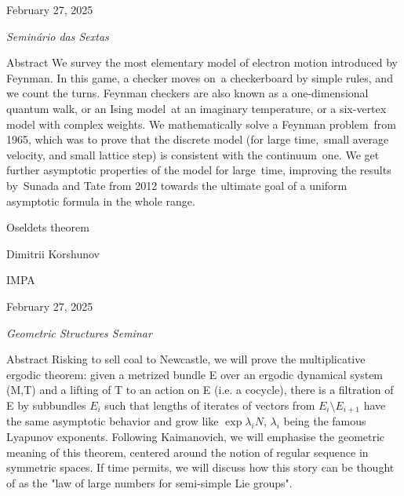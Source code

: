 \hfill{\large February 27, 2025

\hfill \textit{Seminário das Sextas}}

\vspace{2em}

\begin{thing4}{Abstract}
We survey the most elementary model of electron motion introduced by Feynman. In this game, a checker moves on a checkerboard by simple rules, and we count the turns. Feynman checkers are also known as a one-dimensional quantum walk, or an Ising model at an imaginary temperature, or a six-vertex model with complex weights. We mathematically solve a Feynman problem from 1965, which was to prove that the discrete model (for large time, small average velocity, and small lattice step) is consistent with the continuum one. We get further asymptotic properties of the model for large time, improving the results by Sunada and Tate from 2012 towards the ultimate goal of a uniform asymptotic formula in the whole range.
\end{thing4}

\clearpage{}
{\Huge Oseldets theorem}

\hfill{\Large Dimitrii Korshunov}

{\Large \hfill IMPA}

\hfill{\large February 27, 2025

\hfill \textit{Geometric Structures Seminar}}
\vspace{2em}

\begin{thing6}{Abstract}
Risking to sell coal to Newcastle, we will prove the multiplicative ergodic theorem: given a metrized bundle E over an ergodic dynamical system (M,T) and a lifting of T to an action on E (i.e. a cocycle), there is a filtration of E by subbundles $E_i$ such that lengths of iterates of vectors from $E_i\setminus E_{i+1}$ have the same asymptotic behavior and grow like $\operatorname{exp}{\lambda_i N}$, $\lambda_i$ being the famous Lyapunov exponents. Following Kaimanovich, we will emphasise the geometric meaning of this theorem, centered around the notion of regular sequence in symmetric spaces. If time permits, we will discuss how this story can be thought of as the "law of large numbers for semi-simple Lie groups".
\end{thing6}
\vspace{2em}

